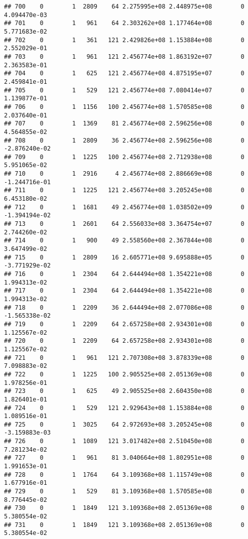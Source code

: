 \documentclass[
]{article}
\begin{document}
\begin{enumerate}
\begin{verbatim}
## 700    0        1  2809    64 2.275995e+08 2.448975e+08        0  4.094470e-03
## 701    0        1   961    64 2.303262e+08 1.177464e+08        0  5.771683e-02
## 702    0        1   361   121 2.429826e+08 1.153884e+08        0  2.552029e-01
## 703    0        1   961   121 2.456774e+08 1.863192e+07        0  2.363583e-01
## 704    0        1   625   121 2.456774e+08 4.875195e+07        0  2.459841e-01
## 705    0        1   529   121 2.456774e+08 7.080414e+07        0  1.139877e-01
## 706    0        1  1156   100 2.456774e+08 1.570585e+08        0  2.037640e-01
## 707    0        1  1369    81 2.456774e+08 2.596256e+08        0  4.564855e-02
## 708    0        1  2809    36 2.456774e+08 2.596256e+08        0 -2.876240e-02
## 709    0        1  1225   100 2.456774e+08 2.712938e+08        0  5.951065e-02
## 710    0        1  2916     4 2.456774e+08 2.886669e+08        0 -1.244716e-01
## 711    0        1  1225   121 2.456774e+08 3.205245e+08        0  6.453180e-02
## 712    0        1  1681    49 2.456774e+08 1.038502e+09        0 -1.394194e-02
## 713    0        1  2601    64 2.556033e+08 3.364754e+07        0  2.744260e-02
## 714    0        1   900    49 2.558560e+08 2.367844e+08        0  3.647499e-02
## 715    0        1  2809    16 2.605771e+08 9.695888e+05        0 -3.771929e-02
## 716    0        1  2304    64 2.644494e+08 1.354221e+08        0  1.994313e-02
## 717    0        1  2304    64 2.644494e+08 1.354221e+08        0  1.994313e-02
## 718    0        1  2209    36 2.644494e+08 2.077086e+08        0 -1.565338e-02
## 719    0        1  2209    64 2.657258e+08 2.934301e+08        0  1.125567e-02
## 720    0        1  2209    64 2.657258e+08 2.934301e+08        0  1.125567e-02
## 721    0        1   961   121 2.707308e+08 3.878339e+08        0  7.098883e-02
## 722    0        1  1225   100 2.905525e+08 2.051369e+08        0  1.978256e-01
## 723    0        1   625    49 2.905525e+08 2.604350e+08        0  1.826401e-01
## 724    0        1   529   121 2.929643e+08 1.153884e+08        0  1.089516e-01
## 725    0        1  3025    64 2.972693e+08 3.205245e+08        0 -3.159883e-03
## 726    0        1  1089   121 3.017482e+08 2.510450e+08        0  7.281234e-02
## 727    0        1   961    81 3.040664e+08 1.802951e+08        0  1.991653e-01
## 728    0        1  1764    64 3.109368e+08 1.115749e+08        0  1.677916e-01
## 729    0        1   529    81 3.109368e+08 1.570585e+08        0  8.776445e-02
## 730    0        1  1849   121 3.109368e+08 2.051369e+08        0  5.380554e-02
## 731    0        1  1849   121 3.109368e+08 2.051369e+08        0  5.380554e-02

\end{verbatim}
\end{enumerate}
\end{document}

